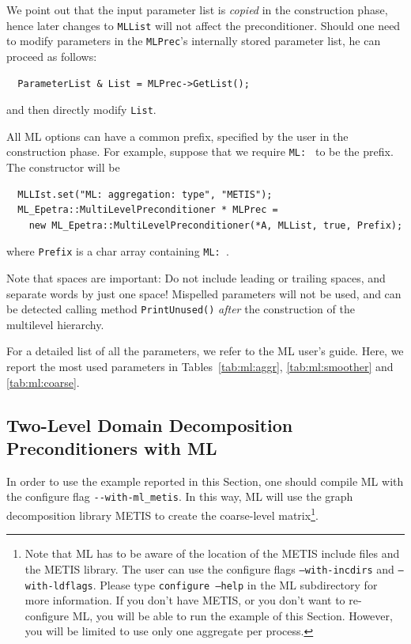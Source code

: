 We point out that the input parameter list is {\sl copied} in the
construction phase, hence later changes to \verb!MLList! will not affect
the preconditioner. Should one need to modify parameters in the
\verb!MLPrec!'s internally stored parameter list, he can proceed as
follows:
\begin{verbatim}
  ParameterList & List = MLPrec->GetList();
\end{verbatim}
and then directly modify \verb!List!.

\medskip

All ML options can have a common prefix, specified by the
user in the construction phase. For example, suppose that we require
\verb!ML: ! to be the prefix. The constructor will be
\begin{verbatim}
  MLLIst.set("ML: aggregation: type", "METIS");
  ML_Epetra::MultiLevelPreconditioner * MLPrec = 
    new ML_Epetra::MultiLevelPreconditioner(*A, MLList, true, Prefix);
\end{verbatim}
where \verb!Prefix! is a char array containing \verb!ML: !.

Note that spaces are important: Do not include leading or trailing
spaces, and separate words by just one space! Mispelled parameters will
not be used, and can be detected calling method \verb!PrintUnused()!
{\sl after} the construction of the multilevel hierarchy. 

For a detailed list of all the parameters, we refer to the ML user's
guide.  Here, we report the most used parameters in
Tables~\ref{tab:ml:aggr}, \ref{tab:ml:smoother} and \ref{tab:ml:coarse}.




\subsection{Two-Level Domain Decomposition Preconditioners with ML}
\label{sec:ml_DD}

In order to use the example reported in this Section, one should compile
ML with the configure flag \verb!--with-ml_metis!. In this way, ML will
use the graph decomposition library METIS to create the coarse-level
matrix\footnote{Note that ML has to be aware of the location of the
  METIS include files and the METIS library. The user can use the
  configure flags {\tt --with-incdirs} and {\tt --with-ldflags}.  Please
  type {\tt configure --help} in the ML subdirectory for more
  information. If you don't have METIS, or you don't want to
  re-configure ML, you will be able to run the example of this Section.
  However, you will be limited to use only one aggregate per process.}.

